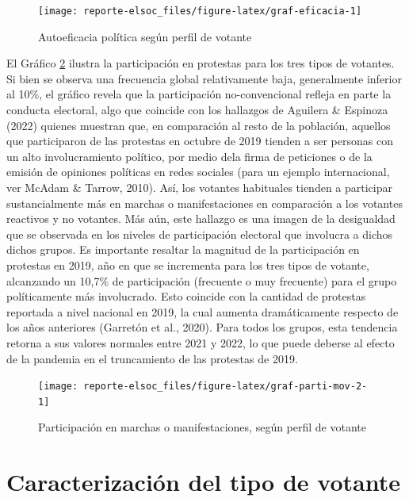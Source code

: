 \documentclass[
  12pt,
]{book}
\begin{document}
\begin{figure}

{\centering \texttt{[image: reporte-elsoc\_files/figure-latex/graf-eficacia-1]} 

}

\caption{Autoeficacia política según perfil de votante}\label{fig:graf-eficacia}
\end{figure}

El Gráfico \ref{fig:graf-parti-mov-2} ilustra la participación en protestas para los tres tipos de votantes. Si bien se observa una frecuencia global relativamente baja, generalmente inferior al 10\%, el gráfico revela que la participación no-convencional refleja en parte la conducta electoral, algo que coincide con los hallazgos de Aguilera \& Espinoza (2022) quienes muestran que, en comparación al resto de la población, aquellos que participaron de las protestas en octubre de 2019 tienden a ser personas con un alto involucramiento político, por medio dela firma de peticiones o de la emisión de opiniones políticas en redes sociales (para un ejemplo internacional, ver McAdam \& Tarrow, 2010). Así, los votantes habituales tienden a participar sustancialmente más en marchas o manifestaciones en comparación a los votantes reactivos y no votantes. Más aún, este hallazgo es una imagen de la desigualdad que se observada en los niveles de participación electoral que involucra a dichos dichos grupos. Es importante resaltar la magnitud de la participación en protestas en 2019, año en que se incrementa para los tres tipos de votante, alcanzando un 10,7\% de participación (frecuente o muy frecuente) para el grupo políticamente más involucrado. Esto coincide con la cantidad de protestas reportada a nivel nacional en 2019, la cual aumenta dramáticamente respecto de los años anteriores (Garretón et al., 2020). Para todos los grupos, esta tendencia retorna a sus valores normales entre 2021 y 2022, lo que puede deberse al efecto de la pandemia en el truncamiento de las protestas de 2019.

\begin{figure}

{\centering \texttt{[image: reporte-elsoc\_files/figure-latex/graf-parti-mov-2-1]} 

}

\caption{Participación en marchas o manifestaciones, según perfil de votante}\label{fig:graf-parti-mov-2}
\end{figure}

\hypertarget{caracterizaciuxf3n-del-tipo-de-votante}{%
\section{Caracterización del tipo de votante}\label{caracterizaciuxf3n-del-tipo-de-votante}}
\end{document}
